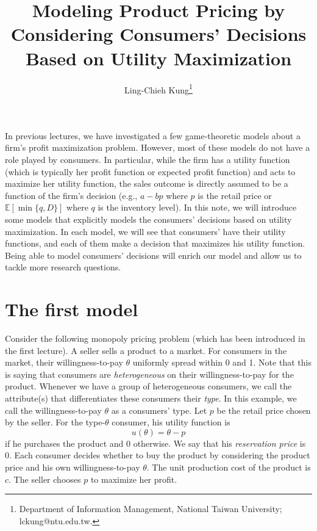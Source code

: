 \documentclass[11pt,a4paper]{article}
\title{Modeling Product Pricing by Considering 
Consumers' Decisions Based on Utility Maximization}
\author{Ling-Chieh Kung\thanks{Department of Information Management, National Taiwan University; lckung@ntu.edu.tw.}}
\date{}
\begin{document}
\maketitle












In previous lectures, we have investigated a few game-theoretic models
about a firm's profit maximization problem.
However, most of these models do not have a role played by consumers.
In particular, while the firm has a utility function (which is typically
her profit function or expected profit function) and acts to maximize her
utility function, the sales outcome is directly assumed to be a function of the
firm's decision (e.g., $a - bp$ where $p$ is the retail price or
$\mathbb{E}[\min\{q, D\}]$ where $q$ is the inventory level).
In this note, we will introduce some models that explicitly models the
consumers' decisions based on utility maximization.
In each model, we will see that consumers' have their utility functions,
and each of them make a decision that maximizes his utility function.
Being able to model consumers' decisions will enrich our model and
allow us to tackle more research questions.







\section{The first model}

Consider the following monopoly pricing problem (which has been introduced
in the first lecture). A seller sells a product to a market. For consumers
in the market, their willingness-to-pay $\theta$ uniformly spread within 0 and 1.
Note that this is saying that consumers are \textit{heterogeneous} on
their willingness-to-pay for the product. Whenever we have a group of
heterogeneous consumers, we call the attribute(s) that differentiates
these consumers their \textit{type}. In this example,
we call the willingness-to-pay $\theta$ as a consumers' type.
Let $p$ be the retail price chosen by the seller.
For the type-$\theta$ consumer, his utility function is
\[
	u(\theta) = \theta - p
\]
if he purchases the product and 0 otherwise.
We say that his \textit{reservation price} is 0.
Each consumer decides whether to buy the product by considering the product
price and his own willingness-to-pay $\theta$.
The unit production cost of the product is $c$.
The seller chooses $p$ to maximize her profit.
\end{document}
